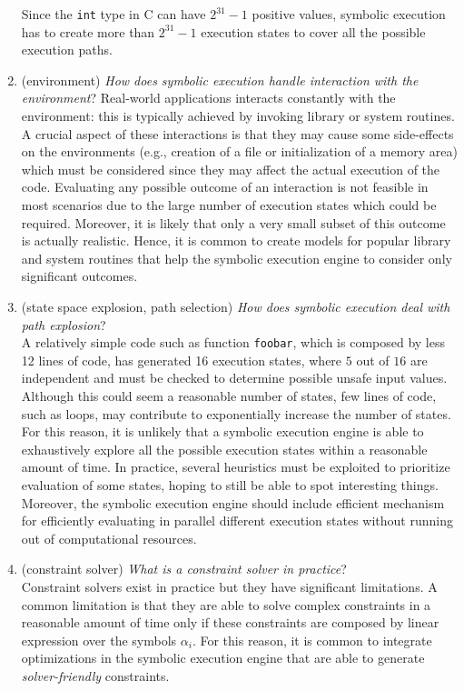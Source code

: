 \documentclass[10pt, a4paper]{article}
\begin{document}
\begin{enumerate}
  Since the {\tt int} type in C can have $2^{31} - 1$ positive values, symbolic execution has to create more than $2^{31} - 1$  execution states to cover all the possible execution paths.
 
  \item (environment) {\em How does symbolic execution handle interaction with the environment}? 
  Real-world applications interacts constantly with the environment: this is typically achieved by invoking library or system routines. A crucial aspect of these interactions is that they may cause some side-effects on the environments (e.g., creation of a file or initialization of a memory area) which must be considered since they may affect the actual execution of the code. Evaluating any possible outcome of an interaction is not feasible in most scenarios due to the large number of execution states which could be required. Moreover, it is likely that only a very small subset of this outcome is actually realistic. Hence, it is common to create models for popular library and system routines that help the symbolic execution engine to consider only significant outcomes.

  \item (state space explosion, path selection) {\em How does symbolic execution deal with path explosion}? \\
  A relatively simple code such as function {\tt foobar}, which is composed by less 12 lines of code, has generated 16 execution states, where $5$ out of $16$ are independent and must be checked to determine possible unsafe input values. Although this could seem a reasonable number of states, few lines of code, such as loops, may contribute to exponentially increase the number of states. For this reason, it is unlikely that a symbolic execution engine is able to exhaustively explore all the possible execution states within a reasonable amount of time. In practice, several heuristics must be exploited to prioritize evaluation of some states, hoping to still be able to spot interesting things. Moreover, the symbolic execution engine should include efficient mechanism for efficiently evaluating in parallel different execution states without running out of computational resources.

  \item (constraint solver) {\em What is a constraint solver in practice}? \\
  Constraint solvers exist in practice but they have significant limitations. A common limitation is that they are able to solve complex constraints in a reasonable amount of time only if these constraints are composed by linear expression over the symbols $\alpha_i$. For this reason, it is common to integrate optimizations in the symbolic execution engine that are able to generate {\em solver-friendly} constraints.


\end{enumerate}
\end{document}

